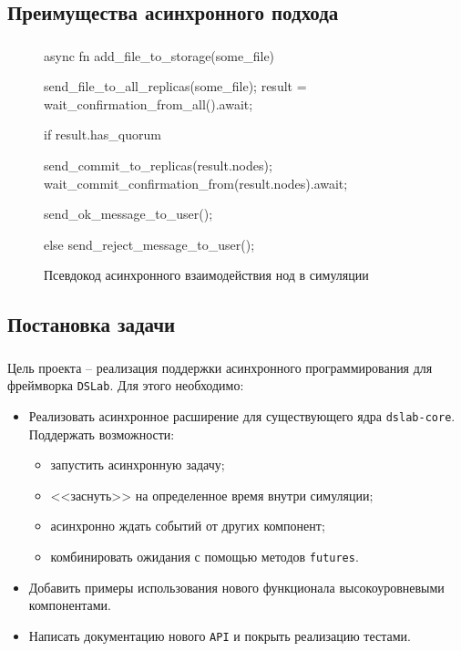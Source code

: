 \documentclass[t]{beamer}  %
\begin{document}
	\subsection{Преимущества асинхронного подхода}
	\begin{frame}[fragile]
		\frametitle{\insertsection} 
		\framesubtitle{\insertsubsection}

		\begin{figure}
			\footnotesize
			\centering
			\begin{rustcode}
async fn add_file_to_storage(some_file) {
  send_file_to_all_replicas(some_file);
  result = wait_confirmation_from_all().await;

  if result.has_quorum {
    send_commit_to_replicas(result.nodes);
    wait_commit_confirmation_from(result.nodes).await;

    send_ok_message_to_user();
  } else {
    send_reject_message_to_user();
  }
}
			\end{rustcode}
			\caption*{Псевдокод асинхронного взаимодействия нод в симуляции}
		\end{figure}


	\end{frame}

	\subsection{Постановка задачи}
	\begin{frame}[fragile]
		\frametitle{\insertsection} 
		\framesubtitle{\insertsubsection}

		\vspace{-0.1cm}
		Цель проекта -- реализация поддержки асинхронного программирования для фреймворка \texttt{DSLab}. Для этого необходимо:
		\vspace{3pt}
		\begin{itemize}
			\item Реализовать асинхронное расширение для существующего ядра \texttt{dslab-core}. Поддержать возможности:
			\begin{itemize}
				\item запустить асинхронную задачу;
				\item <<заснуть>> на определенное время внутри симуляции;
				\item асинхронно ждать событий от других компонент;
				\item комбинировать ожидания с помощью методов \texttt{futures}.
			\end{itemize}
			\item Добавить примеры использования нового функционала высокоуровневыми компонентами.
			\item Написать документацию нового \texttt{API} и покрыть реализацию тестами.
		\end{itemize}


	\end{frame}
\end{document}
